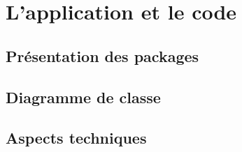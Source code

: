 \chapter{L'application et le code}



	\section{Présentation des packages}



	\section{Diagramme de classe}



	\section{Aspects techniques}
